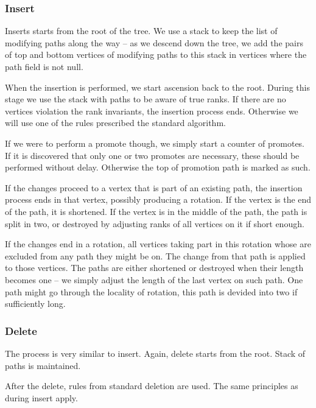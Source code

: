 \subsubsection{Insert}

Inserts starts from the root of the tree. We use a stack to keep the list of modifying paths along the way -- as we descend down the tree, we add the pairs of top and bottom vertices of modifying paths to this stack in vertices where the path field is not null. 

When the insertion is performed, we start ascension back to the root. During this stage we use the stack with paths to be aware of true ranks. If there are no vertices violation the rank invariants, the insertion process ends. Otherwise we will use one of the rules prescribed the standard algorithm. 

If we were to perform a promote though, we simply start a counter of promotes. If it is discovered that only one or two promotes are necessary, these should be performed without delay. Otherwise the top of promotion path is marked as such. 

If the changes proceed to a vertex that is part of an existing path, the insertion process ends in that vertex, possibly producing a rotation. If the vertex is the end of the path, it is shortened. If the vertex is in the middle of the path, the path is split in two, or destroyed by adjusting ranks of all vertices on it if short enough.

If the changes end in a rotation, all vertices taking part in this rotation whose are excluded from any path they might be on. The change from that path is applied to those vertices. The paths are either shortened or destroyed when their length becomes one -- we simply adjust the length of the last vertex on such path. One path might go through the locality of rotation, this path is devided into two if sufficiently long.

\subsubsection{Delete}

The process is very similar to insert. Again, delete starts from the root. Stack of paths is maintained. 

After the delete, rules from standard deletion are used. The same principles as during insert apply.
